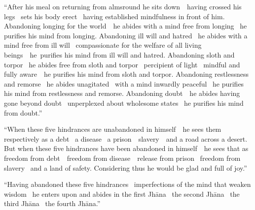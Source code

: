 \begin{english-only-justify}
  ``After his meal on returning from almsround he sits \mbox{down}~\breathmark\ having crossed his legs \breathmark\ sets his body erect \breathmark\ having established mindfulness in front of him. Abandoning longing \ifdigital\makeatletter\hyperlink{endnote61-appendix}\makeatother\thinspace\fi
  for the \mbox{world}~\breathmark\ he abides with a mind free from longing \breathmark\ he purifies his mind from longing. Abandoning ill will and hatred \breathmark\ he abides with a mind free from ill will \breathmark\ compassionate for the welfare of all living \mbox{beings}~\breathmark\ he~purifies his mind from ill will and hatred. Abandoning sloth and torpor \breathmark\ he abides free from sloth and torpor \breathmark\ percipient of light \breathmark\ mindful and fully \mbox{aware}~\breathmark\ he purifies his mind from sloth and torpor. Abandoning restlessness and remorse \breathmark\ he abides unagitated \breathmark\ with a mind inwardly peaceful \breathmark\ he purifies his mind from restlessness and remorse. Abandoning \mbox{doubt}~\breathmark\ he abides having gone beyond doubt \breathmark\ unperplexed about wholesome states \breathmark\ he purifies his mind from doubt.''
\end{english-only-justify}

\suttaRef{[MN 107]}

\begin{english-only-justify}
  ``When these five hindrances are unabandoned in \mbox{himself}~\breathmark\ he sees them respectively as a debt \breathmark\ a disease \breathmark\ a \mbox{prison}~\breathmark\ \mbox{slavery}~\breathmark\ and a road across a desert. But when these five hindrances have been abandoned in \mbox{himself}~\breathmark\ he sees that as freedom from \mbox{debt}~\breathmark\ freedom from \mbox{disease}~\breathmark\ release from prison \breathmark\ freedom from slavery \breathmark\ and a land of safety. Considering thus he would be glad and full of joy.''
\end{english-only-justify}

\begin{english-only-justify}
  ``Having abandoned these five hindrances \breathmark\ imperfections of the mind that weaken wisdom \breathmark\ he enters upon and abides in the first Jhāna \breathmark\ the second Jhāna \breathmark\ the third Jhāna \breathmark\ the fourth Jhāna.''
\end{english-only-justify}

